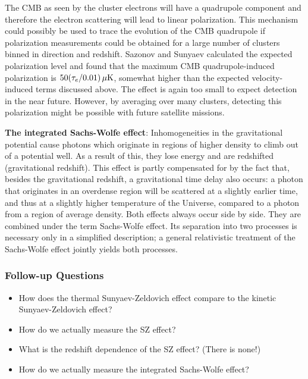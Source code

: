 \documentclass[a4paper,11pt]{article}
\begin{document}
{\noindent}The CMB as seen by the cluster electrons will have a quadrupole component and therefore the electron scattering will lead to linear polarization. This mechanism could possibly be used to trace the evolution of the CMB quadrupole if polarization measurements could be obtained for a large number of clusters binned in direction and redshift. Sazonov and Sunyaev calculated the expected polarization level and found that the maximum CMB quadrupole-induced polarization is $50(\tau_e/0.01)\,{\rm \mu K}$, somewhat higher than the expected velocity-induced terms discussed above. The effect is again too small to expect detection in the near future. However, by averaging over many clusters, detecting this polarization might be possible with future satellite missions.

{\noindent}\textbf{The integrated Sachs-Wolfe effect}: Inhomogeneities in the gravitational potential cause photons which originate in regions of higher density to climb out of a potential well. As a result of this, they lose energy and are redshifted (gravitational redshift). This effect is partly compensated for by the fact that, besides the gravitational redshift, a gravitational time delay also occurs: a photon that originates in an overdense region will be scattered at a slightly earlier time, and thus at a slightly higher temperature of the Universe, compared to a photon from a region of average density. Both effects always occur side by side. They are combined under the term Sachs-Wolfe effect. Its separation into two processes is necessary only in a simplified description; a general relativistic treatment of the Sachs-Wolfe effect jointly yields both processes.

\subsubsection{Follow-up Questions}

\begin{itemize}
    \item How does the thermal Sunyaev-Zeldovich effect compare to the kinetic Sunyaev-Zeldovich effect?
    \item How do we actually measure the SZ effect?
    \item What is the redshift dependence of the SZ effect? (There is none!)
    \item How do we actually measure the integrated Sachs-Wolfe effect?
\end{itemize}


%
%
\end{document}
